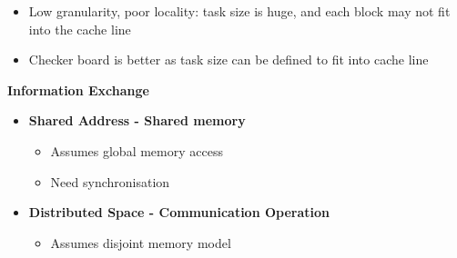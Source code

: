 \documentclass[10pt, landscape]{article}
\begin{document}
\begin{multicols}{4}
\begin{itemize}
    \begin{itemize}
        \item Low granularity, poor locality: task size is huge, and each block may not fit into the cache line 
        \item Checker board is better as task size can be defined to fit into cache line
    \end{itemize}
\end{itemize}

\textbf{Information Exchange}
\begin{itemize}
    \item \textbf{Shared Address - Shared memory}
    \begin{itemize}
        \item Assumes global memory access 
        \item Need synchronisation 
    \end{itemize}
    \item \textbf{Distributed Space - Communication Operation}
    \begin{itemize}
        \item Assumes disjoint memory model
    \end{itemize}
\end{itemize}


\end{multicols}
\end{document}
